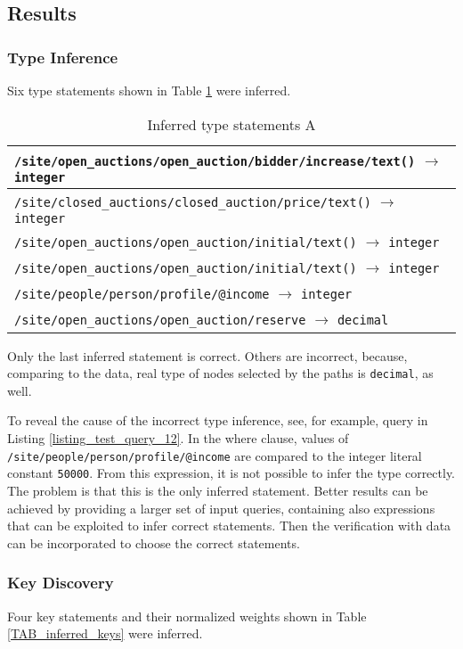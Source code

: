 \subsection{Results}

\subsubsection{Type Inference}
Six type statements shown in Table \ref{TAB_inferred_types} were inferred.

\begin{table}
\begin{tabular}{|l|}
\hline
\texttt{/site/open\_auctions/open\_auction/bidder/increase/text()} $\rightarrow$ \texttt{integer} \\ \hline
\texttt{/site/closed\_auctions/closed\_auction/price/text()} $\rightarrow$ \texttt{integer} \\ \hline
\texttt{/site/open\_auctions/open\_auction/initial/text()} $\rightarrow$ \texttt{integer} \\ \hline
\texttt{/site/open\_auctions/open\_auction/initial/text()} $\rightarrow$ \texttt{integer} \\ \hline
\texttt{/site/people/person/profile/@income} $\rightarrow$ \texttt{integer} \\ \hline
\texttt{/site/open\_auctions/open\_auction/reserve} $\rightarrow$ \texttt{decimal} \\ \hline
\end{tabular}
\caption{Inferred type statements A}
\label{TAB_inferred_types}
\end{table}

Only the last inferred statement is correct. Others are incorrect, because, comparing to the data, real type of nodes selected by the paths is \texttt{decimal}, as well.

To reveal the cause of the incorrect type inference, see, for example, query in Listing \ref{listing_test_query_12}. In the where clause, values of \texttt{/site/people/person/profile/\-@income} are compared to the integer literal constant \texttt{50000}. From this expression, it is not possible to infer the type correctly. The problem is that this is the only inferred statement. Better results can be achieved by providing a larger set of input queries, containing also expressions that can be exploited to infer correct statements. Then the verification with data can be incorporated to choose the correct statements.

\subsubsection{Key Discovery}
Four key statements and their normalized weights shown in Table \ref{TAB_inferred_keys} were inferred.

